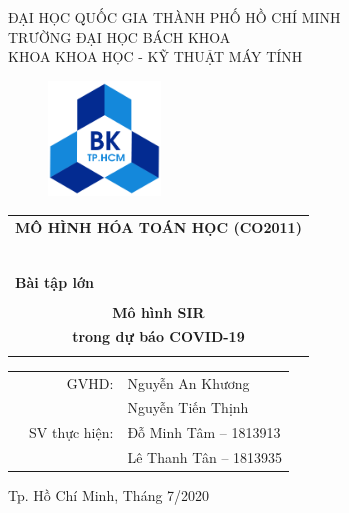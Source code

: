 \documentclass[a4paper]{article}
\begin{document}
\begin{titlepage}
\begin{center}
ĐẠI HỌC QUỐC GIA THÀNH PHỐ HỒ CHÍ MINH \\
TRƯỜNG ĐẠI HỌC BÁCH KHOA \\
KHOA KHOA HỌC - KỸ THUẬT MÁY TÍNH 
\end{center}

\vspace{1cm}

\begin{figure}[h!]
\begin{center}
\includegraphics[width=3cm]{Images/hcmut.png}
\end{center}
\end{figure}

\vspace{1cm}


\begin{center}
\begin{tabular}{c}
\multicolumn{1}{l}{\textbf{{\Large MÔ HÌNH HÓA TOÁN HỌC (CO2011)}}}\\
~~\\
\hline
\\
\multicolumn{1}{l}{\textbf{{\Large \null \qquad \qquad \qquad \quad Bài tập lớn}}}\\
\\
\textbf{{\Huge Mô hình SIR}} \\
\textbf{{\Huge trong dự báo COVID-19}}\\
\\
\hline
\end{tabular}
\end{center}

\vspace{1.5cm}

\begin{table}[h]
\begin{tabular}{rrl}
\hspace{5 cm} & GVHD: & Nguyễn An Khương\\
\hspace{5 cm} &  & Nguyễn Tiến Thịnh\\
& SV thực hiện: & Đỗ Minh Tâm -- 1813913 \\
& & Lê Thanh Tân -- 1813935\\

\end{tabular}
\end{table}
\vspace{1.5cm}
\begin{center}
{\footnotesize Tp. Hồ Chí Minh, Tháng 7/2020}
\end{center}
\end{titlepage}
\end{document}
